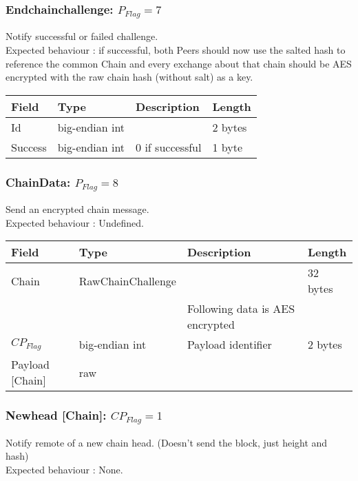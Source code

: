 \documentclass[a4paper,10pt]{article}
\begin{document}
            \subsubsection{Endchainchallenge: $P_{Flag} = 7$}
                Notify successful or failed challenge.\\
                Expected behaviour : if successful, both Peers should now use the salted hash to reference the common Chain and every exchange about that chain should be AES encrypted with the raw chain hash (without salt) as a key.\\
                
                \noindent\begin{tabularx}{\textwidth}{|l|l|X|l|}
                    \hline Field & Type & Description & Length \\ \hline
                    \hline Id & big-endian int & & 2 bytes \\
                    \hline Success & big-endian int & 0 if successful & 1 byte \\
                    \hline
                \end{tabularx}
            
            \subsubsection{ChainData: $P_{Flag} = 8$}
                Send an encrypted chain message.\\
                Expected behaviour : Undefined.\\
                
                \noindent\begin{tabularx}{\textwidth}{|l|l|X|l|}
                    \hline Field & Type & Description & Length \\ \hline
                    \hline Chain & RawChainChallenge& & 32 bytes \\
                    \hline  & & Following data is AES encrypted & \\
                    \hline $CP_{Flag}$ & big-endian int & Payload identifier & 2 bytes \\
                    \hline Payload [Chain] & raw &  & \\
                    \hline 
                \end{tabularx}
            
            \subsubsection{Newhead [Chain]: $CP_{Flag} = 1$}
                Notify remote of a new chain head. (Doesn't send the block, just height and hash)\\
                Expected behaviour : None.\\
                
\end{document}
